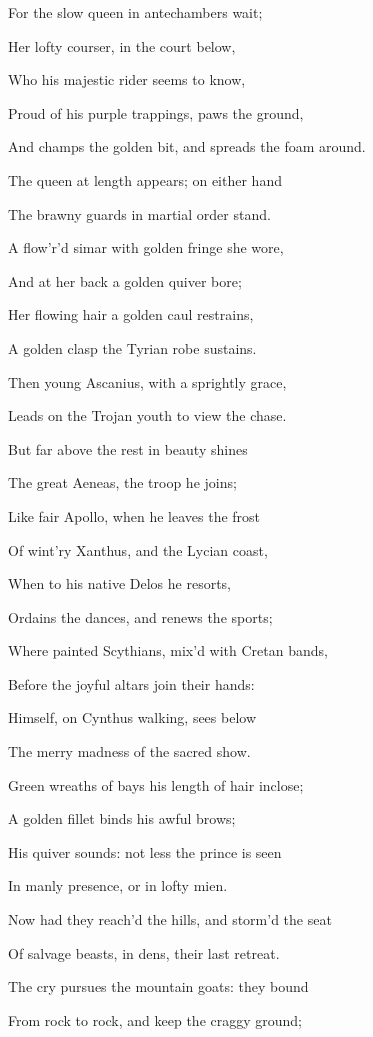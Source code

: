 For the slow queen in antechambers wait;

Her lofty courser, in the court below,

Who his majestic rider seems to know,

Proud of his purple trappings, paws the ground,

And champs the golden bit, and spreads the foam around.

The queen at length appears; on either hand

The brawny guards in martial order stand.

A flow’r’d simar with golden fringe she wore,

And at her back a golden quiver bore;

Her flowing hair a golden caul restrains,

A golden clasp the Tyrian robe sustains.

Then young Ascanius, with a sprightly grace,

Leads on the Trojan youth to view the chase.

But far above the rest in beauty shines

The great Aeneas, the troop he joins;

Like fair Apollo, when he leaves the frost

Of wint’ry Xanthus, and the Lycian coast,

When to his native Delos he resorts,

Ordains the dances, and renews the sports;

Where painted Scythians, mix’d with Cretan bands,

Before the joyful altars join their hands:

Himself, on Cynthus walking, sees below

The merry madness of the sacred show.

Green wreaths of bays his length of hair inclose;

A golden fillet binds his awful brows;

His quiver sounds: not less the prince is seen

In manly presence, or in lofty mien.

Now had they reach’d the hills, and storm’d the seat

Of salvage beasts, in dens, their last retreat.

The cry pursues the mountain goats: they bound

From rock to rock, and keep the craggy ground;

